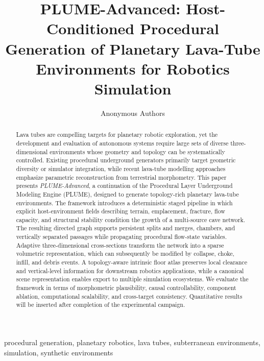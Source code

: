 \documentclass[conference]{IEEEtran}
\begin{document}
\title{PLUME-Advanced: Host-Conditioned Procedural Generation of Planetary Lava-Tube Environments for Robotics Simulation}

\author{Anonymous Authors}

\maketitle

\begin{abstract}
Lava tubes are compelling targets for planetary robotic exploration, yet the development and evaluation of autonomous systems require large sets of diverse three-dimensional environments whose geometry and topology can be systematically controlled. Existing procedural underground generators primarily target geometric diversity or simulator integration, while recent lava-tube modelling approaches emphasize parametric reconstruction from terrestrial morphometry. This paper presents \emph{PLUME-Advanced}, a continuation of the Procedural Layer Underground Modeling Engine (PLUME), designed to generate topology-rich planetary lava-tube environments. The framework introduces a deterministic staged pipeline in which explicit host-environment fields describing terrain, emplacement, fracture, flow capacity, and structural stability condition the growth of a multi-source cave network. The resulting directed graph supports persistent splits and merges, chambers, and vertically separated passages while propagating procedural flow-state variables. Adaptive three-dimensional cross-sections transform the network into a sparse volumetric representation, which can subsequently be modified by collapse, choke, infill, and debris events. A topology-aware intrinsic floor atlas preserves local clearance and vertical-level information for downstream robotics applications, while a canonical scene representation enables export to multiple simulation ecosystems. We evaluate the framework in terms of morphometric plausibility, causal controllability, component ablation, computational scalability, and cross-target consistency. Quantitative results will be inserted after completion of the experimental campaign.
\end{abstract}

\begin{IEEEkeywords}
procedural generation, planetary robotics, lava tubes, subterranean environments, simulation, synthetic environments
\end{IEEEkeywords}
\end{document}
